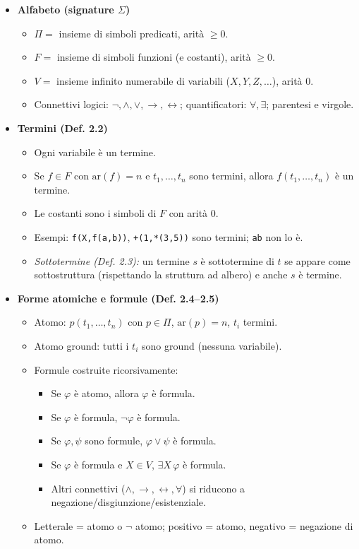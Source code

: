 \documentclass[12pt]{article}
\begin{document}
\begin{itemize}
  \item \textbf{Alfabeto (signature $\Sigma$)}
    \begin{itemize}
      \item $\Pi=$ insieme di simboli predicati, arità $\geq 0$.
      \item $F=$ insieme di simboli funzioni (e costanti), arità $\geq 0$.
      \item $V=$ insieme infinito numerabile di variabili ($X,Y,Z,\dots$), arità 0.
      \item Connettivi logici: $\neg,\land,\lor,\rightarrow,\leftrightarrow$; quantificatori: $\forall,\exists$; parentesi e virgole.
    \end{itemize}

  \item \textbf{Termini (Def. 2.2)}
    \begin{itemize}
      \item Ogni variabile è un termine.
      \item Se $f \in F$ con $\mathrm{ar}(f)=n$ e $t_1,\dots,t_n$ sono termini, allora $f(t_1,\dots,t_n)$ è un termine.
      \item Le costanti sono i simboli di $F$ con arità 0.
      \item Esempi: \texttt{f(X,f(a,b))}, \texttt{+(1,*(3,5))} sono termini; \texttt{ab} non lo è.
      \item \emph{Sottotermine (Def. 2.3):} un termine $s$ è sottotermine di $t$ se appare come sottostruttura (rispettando la struttura ad albero) e anche $s$ è termine.
    \end{itemize}

  \item \textbf{Forme atomiche e formule (Def. 2.4–2.5)}
    \begin{itemize}
      \item Atomo: $p(t_1,\dots,t_n)$ con $p \in \Pi$, $\mathrm{ar}(p)=n$, $t_i$ termini.
      \item Atomo ground: tutti i $t_i$ sono ground (nessuna variabile).
      \item Formule costruite ricorsivamente:
        \begin{itemize}
          \item Se $\varphi$ è atomo, allora $\varphi$ è formula.
          \item Se $\varphi$ è formula, $\neg\varphi$ è formula.
          \item Se $\varphi,\psi$ sono formule, $\varphi \lor \psi$ è formula.
          \item Se $\varphi$ è formula e $X \in V$, $\exists X\,\varphi$ è formula.
          \item Altri connettivi ($\land,\rightarrow,\leftrightarrow,\forall$) si riducono a negazione/disgiunzione/esistenziale.
        \end{itemize}
      \item Letterale = atomo o $\neg$ atomo; positivo = atomo, negativo = negazione di atomo.
    \end{itemize}


\end{itemize}
\end{document}
